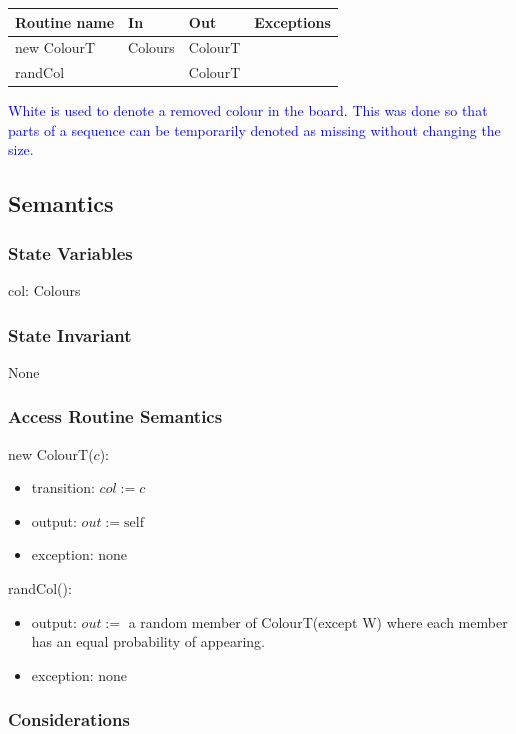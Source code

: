 \documentclass[12pt]{article}
\newcommand{\note}{\noindent \textcolor{blue}}
\begin{document}
\begin{tabular}{| l | l | l | l |}
	\hline
	\textbf{Routine name} & \textbf{In} & \textbf{Out} & \textbf{Exceptions}\\
	\hline
	new ColourT & Colours & ColourT & ~\\
	\hline
	randCol & ~ & ColourT & ~\\
	\hline
\end{tabular}

\note{White is used to denote a removed colour in the board. This was done so that parts of a sequence can be temporarily denoted as missing without changing the size. }\\

\subsection* {Semantics}

\subsubsection* {State Variables}

col: Colours

\subsubsection* {State Invariant}

None

\subsubsection* {Access Routine Semantics}

\noindent new ColourT($c$):
\begin{itemize}
	\item transition: $\mathit{col} := c$
	\item output: $out := \mbox{self}$
	\item exception: none
\end{itemize}

\noindent randCol():
\begin{itemize}
	\item output: $out := $ a random member of ColourT(except W) where each member has an equal probability of appearing.
	\item exception: none
\end{itemize}

\subsubsection* {Considerations}
\end{document}
